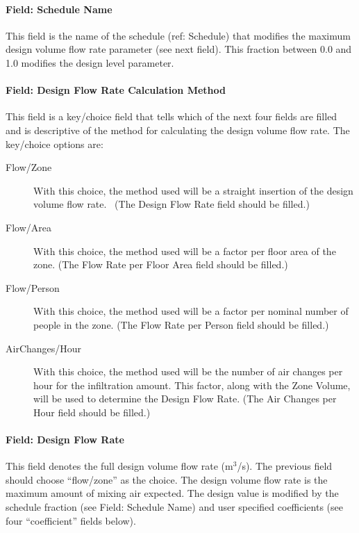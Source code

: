 \paragraph{Field: Schedule Name}\label{field-schedule-name-3}

This field is the name of the schedule (ref: Schedule) that modifies the maximum design volume flow rate parameter (see next field). This fraction between 0.0 and 1.0 modifies the design level parameter.

\paragraph{Field: Design Flow Rate Calculation Method}\label{field-design-flow-rate-calculation-method-2}

This field is a key/choice field that tells which of the next four fields are filled and is descriptive of the method for calculating the design volume flow rate. The key/choice options are:

\begin{description}

\item[Flow/Zone] With this choice, the method used will be a straight insertion of the design volume flow rate.~ (The Design Flow Rate field should be filled.)

\item[Flow/Area] With this choice, the method used will be a factor per floor area of the zone. (The Flow Rate per Floor Area field should be filled.)

\item[Flow/Person] With this choice, the method used will be a factor per nominal number of people in the zone. (The Flow Rate per Person field should be filled.)

\item[AirChanges/Hour] With this choice, the method used will be the number of air changes per hour for the infiltration amount. This factor, along with the Zone Volume, will be used to determine the Design Flow Rate. (The Air Changes per Hour field should be filled.)

\end{description}

\paragraph{Field: Design Flow Rate}\label{field-design-flow-rate-2}

This field denotes the full design volume flow rate (m\(^{3}\)/s). The previous field should choose ``flow/zone'' as the choice. The design volume flow rate is the maximum amount of mixing air expected. The design value is modified by the schedule fraction (see Field: Schedule Name) and user specified coefficients (see four ``coefficient'' fields below).

